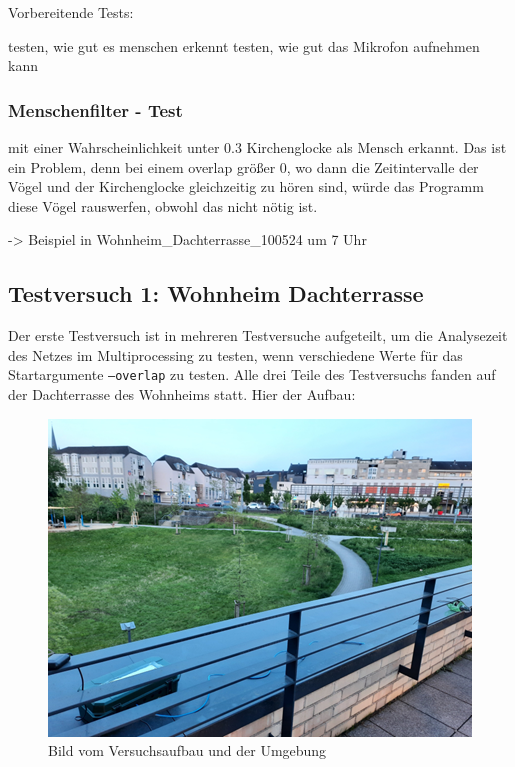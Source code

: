 
Vorbereitende Tests:

testen, wie gut es menschen erkennt
testen, wie gut das Mikrofon aufnehmen kann


\subsubsection{Menschenfilter - Test}

mit einer Wahrscheinlichkeit unter 0.3 Kirchenglocke als Mensch erkannt. Das ist ein Problem, denn bei einem overlap größer 0, wo dann die Zeitintervalle der Vögel und der Kirchenglocke gleichzeitig  zu hören sind, würde das Programm diese Vögel rauswerfen, obwohl das nicht nötig ist.

-> Beispiel in Wohnheim\_Dachterrasse\_100524 um 7 Uhr



\subsection{Testversuch 1: Wohnheim Dachterrasse}

Der erste Testversuch ist in mehreren Testversuche aufgeteilt, um die Analysezeit des Netzes im Multiprocessing zu testen, wenn verschiedene Werte für das Startargumente \texttt{--overlap} zu testen. 
Alle drei Teile des Testversuchs fanden auf der Dachterrasse des Wohnheims statt. Hier der Aufbau:

\begin{figure}
    \centering
    \includegraphics[width=1\linewidth]{bilder/wohnheim_01.png}
    \caption{Bild vom Versuchsaufbau und der Umgebung}
    \label{fig:enter-label}
\end{figure}

